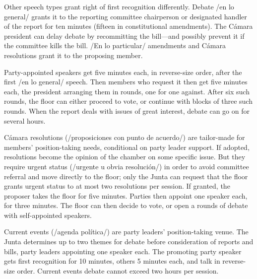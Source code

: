 \documentclass[letter,12pt]{article}
\begin{document}
Other speech types grant right of first recognition differently. Debate /en lo general/ grants it to the reporting committee chairperson or designated handler of the report for ten minutes (fifteen in constitutional amendments). The Cámara president can delay debate by recommitting the bill---and possibly prevent it if the committee kills the bill. /En lo particular/ amendments and Cámara resolutions grant it to the proposing member. 

Party-appointed speakers get five minutes each, in reverse-size order, after the first /en lo general/ speech. Then members who request it then get five minutes each, the president arranging them in rounds, one for one against. After six such rounds, the floor can either proceed to vote, or continue with blocks of three such rounds. When the report deals with issues of great interest, debate can go on for several hours.




Cámara resolutions (/proposiciones con punto de acuerdo/) are tailor-made for members' position-taking needs, conditional on party leader support. If adopted, resolutions become the opinion of the chamber on some specific issue. But they require urgent status (/urgente u obvia resolución/) in order to avoid committee referral and move directly to the floor; only the Junta can request that the floor grants urgent status to at most two resolutions per session. If granted, the proposer takes the floor for five minutes. Parties then appoint one speaker each, for three minutes. The floor can then decide to vote, or open a rounds of debate with self-appointed speakers.

Current events (/agenda política/) are party leaders' position-taking venue. The Junta determines up to two themes for debate before consideration of reports and bills, party leaders appointing one speaker each. The promoting party speaker gets first recognition for 10 minutes, others 5 minutes each, and talk in reverse-size order. Current events debate cannot exceed two hours per session. 
\end{document}

